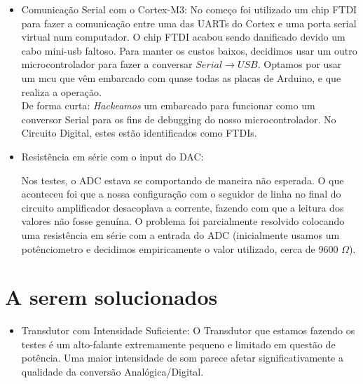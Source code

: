 \documentclass[12pt,a4paper]{report}
\begin{document}
	\begin{itemize}
		
		
		\item Comunicação Serial com o Cortex-M3:
		No começo foi utilizado um chip FTDI para fazer a comunicação entre uma das UARTs do Cortex e uma porta serial virtual num computador. O chip FTDI acabou sendo danificado devido um cabo mini-usb faltoso. Para manter os custos baixos, decidimos usar um outro microcontrolador para fazer a conversar $Serial \to USB$. Optamos por usar um mcu que vêm embarcado com quase todas as placas de Arduino, e que realiza a operação.\\
		
		De forma curta: {\it Hackeamos} um embarcado para funcionar como um conversor Serial para os fins de debugging do nosso microcontrolador. No Circuito Digital, estes estão identificados como FTDIs.
		
		\item Resistência em série com o input do DAC:
		
		Nos testes, o ADC estava se comportando de maneira não esperada. O que aconteceu foi que a nossa configuração com o seguidor de linha no final do circuito amplificador desacoplava a corrente, fazendo com que a leitura dos valores não fosse genuína. O problema foi parcialmente resolvido colocando uma resistência em série com a entrada do ADC (inicialmente usamos um potênciometro e decidimos empiricamente o valor utilizado, cerca de 9600 $\Omega$).
		
	\end{itemize}
	
	\section{A serem solucionados}
	
	\begin{itemize}
		\item Transdutor com Intensidade Suficiente:
		O Transdutor que estamos fazendo os testes é um alto-falante extremamente pequeno e limitado em questão de potência. Uma maior intensidade de som parece afetar significativamente a qualidade da conversão Analógica/Digital.
	\end{itemize}
	
	
\end{document}
